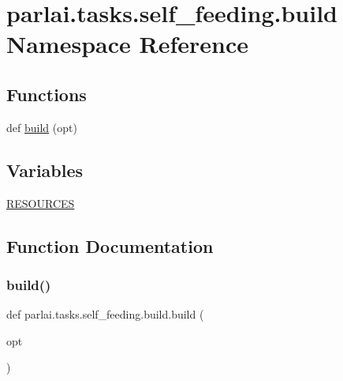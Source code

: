 \hypertarget{namespaceparlai_1_1tasks_1_1self__feeding_1_1build}{}\section{parlai.\+tasks.\+self\+\_\+feeding.\+build Namespace Reference}
\label{namespaceparlai_1_1tasks_1_1self__feeding_1_1build}
\subsection*{Functions}
\begin{DoxyCompactItemize}
\item 
def \hyperlink{namespaceparlai_1_1tasks_1_1self__feeding_1_1build_a59c71646a74f5762ffb019cf79fd9091}{build} (opt)
\end{DoxyCompactItemize}
\subsection*{Variables}
\begin{DoxyCompactItemize}
\item 
\hyperlink{namespaceparlai_1_1tasks_1_1self__feeding_1_1build_a36785c9ba098b24f10266cd123c8f514}{R\+E\+S\+O\+U\+R\+C\+ES}
\end{DoxyCompactItemize}


\subsection{Function Documentation}
\mbox{\label{namespaceparlai_1_1tasks_1_1self__feeding_1_1build_a59c71646a74f5762ffb019cf79fd9091}} 
\subsubsection{\texorpdfstring{build()}{build()}}
{\footnotesize\ttfamily def parlai.\+tasks.\+self\+\_\+feeding.\+build.\+build (\begin{DoxyParamCaption}\item[{}]{opt }\end{DoxyParamCaption})}



